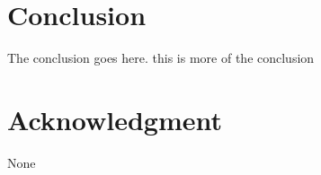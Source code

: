 \documentclass[10pt, conference, compsocconf]{IEEEtran}
\begin{document}
%





\section{Conclusion}
The conclusion goes here. this is more of the conclusion



\section*{Acknowledgment}
None



\end{document}
